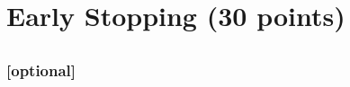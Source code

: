 \documentclass[a4paper,12pt]{article}
\begin{document}
\section{Early Stopping (30 points)}

\subsection{} %

\subsubsection{} %

\subsubsection{} %

\subsubsection{} %

\subsection{} %

\subsection{} %

\subsection{} %

\subsection{} %

\subsubsection{} %

\subsubsection{[optional]} %

\subsubsection{} %
\end{document}
